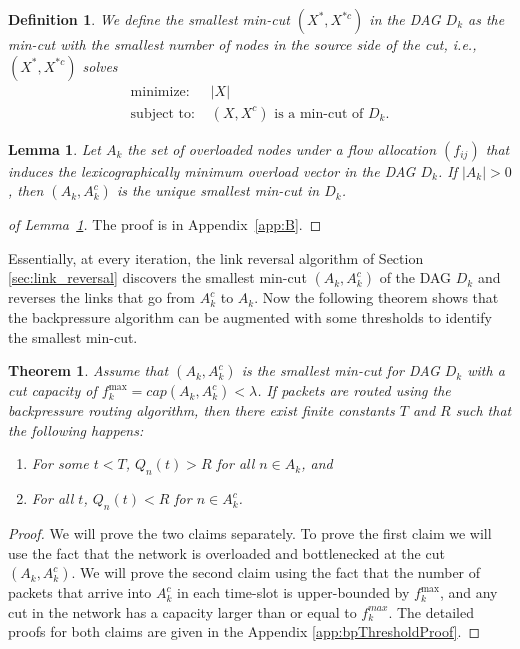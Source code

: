 \documentclass{sig-alternate-2013}
\newtheorem{definition}{Definition}
\newtheorem{lemma}{Lemma}
\newtheorem{theorem}{Theorem}
\begin{document}
\begin{definition}\label{def:smallest min-cut}
We define the smallest min-cut $(X^*,X^{*c})$ in the DAG $D_{k}$ as the min-cut with the smallest number of nodes in the source side of the cut, i.e., $(X^*,X^{*c})$ solves
\begin{align*}
\text{minimize: } & |X|\\
\text{subject to: } & (X,X^c) \text{ is a min-cut of } D_k.
\end{align*}
\end{definition}

\begin{lemma}\label{SMALLEST MIN-CUT}
Let $A_{k}$  the set of overloaded nodes under a flow allocation $(f_{ij})$ that induces the lexicographically minimum overload vector in the DAG $D_{k}$. If $|A_{k}| > 0$, then $(A_{k}, A_{k}^c)$ is the unique smallest min-cut in $D_{k}$.
\end{lemma}
\begin{proof}[of Lemma~\ref{SMALLEST MIN-CUT}]
The proof is in Appendix~\ref{app:B}.
\end{proof}



Essentially, at every iteration, the link reversal algorithm of Section \ref{sec:link_reversal} discovers the smallest min-cut $(A_k,A_k^c)$ of the DAG $D_k$ and reverses the links that go from $A_k^c$ to $A_k$. Now the following theorem shows that the backpressure algorithm can be augmented with some thresholds to identify the smallest min-cut.

\begin{theorem} \label{BP_THRESHOLD_PROOF}
Assume that $(A_k,A_k^c)$ is the smallest min-cut for DAG $D_k$ with a cut capacity of $f_k^{\max} = cap (A_k,A_k^c) < \lambda$. If packets are routed using the backpressure routing algorithm, then there exist finite constants $T$ and $R$ such that the following happens:
\begin{enumerate}
\item For some $t<T$, $Q_n(t)>R$ for all $n\in A_k$, and
\item For all $t$, $Q_n(t) < R$ for $n\in A_k^c$.
\end{enumerate}
\end{theorem}

\begin{proof}
We will prove the two claims separately. To prove the first claim we will use the fact that the network is overloaded and bottlenecked at the cut $(A_k,A_k^c)$. We will prove the second claim using the fact that the number of packets that arrive into $A_k^c$ in each time-slot is upper-bounded by $f_k^{\max}$, and any cut in the network has a capacity larger than or equal to $f_k^{max}$. The detailed proofs for both claims are given in the Appendix \ref{app:bpThresholdProof}.
\end{proof}
\end{document}
